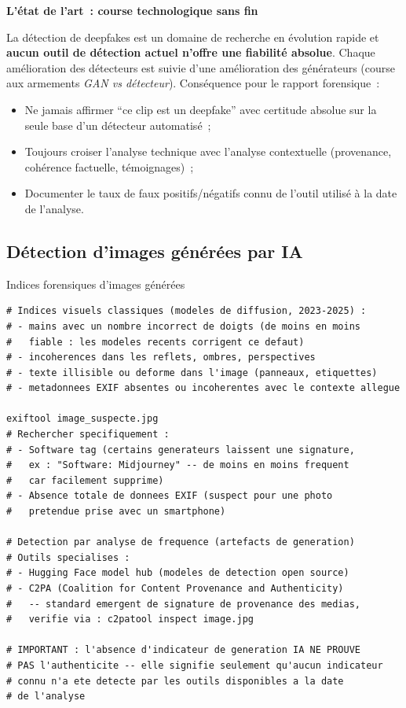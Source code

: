 \begin{boxalert}
\textbf{L'état de l'art~: course technologique sans fin}

La détection de deepfakes est un domaine de recherche en évolution
rapide et \textbf{aucun outil de détection actuel n'offre une
fiabilité absolue}. Chaque amélioration des détecteurs est suivie
d'une amélioration des générateurs (course aux armements
\textit{GAN vs détecteur}). Conséquence pour le rapport forensique~:
\begin{itemize}
    \item Ne jamais affirmer ``ce clip est un deepfake'' avec
          certitude absolue sur la seule base d'un détecteur
          automatisé~;
    \item Toujours croiser l'analyse technique avec l'analyse
          contextuelle (provenance, cohérence factuelle, témoignages)~;
    \item Documenter le taux de faux positifs/négatifs connu
          de l'outil utilisé à la date de l'analyse.
\end{itemize}
\end{boxalert}

\subsection{Détection d'images générées par IA}

\begin{boxoutils}{Indices forensiques d'images générées}
\begin{lstlisting}[language=bash_forensique]
# Indices visuels classiques (modeles de diffusion, 2023-2025) :
# - mains avec un nombre incorrect de doigts (de moins en moins
#   fiable : les modeles recents corrigent ce defaut)
# - incoherences dans les reflets, ombres, perspectives
# - texte illisible ou deforme dans l'image (panneaux, etiquettes)
# - metadonnees EXIF absentes ou incoherentes avec le contexte allegue

exiftool image_suspecte.jpg
# Rechercher specifiquement :
# - Software tag (certains generateurs laissent une signature,
#   ex : "Software: Midjourney" -- de moins en moins frequent
#   car facilement supprime)
# - Absence totale de donnees EXIF (suspect pour une photo
#   pretendue prise avec un smartphone)

# Detection par analyse de frequence (artefacts de generation)
# Outils specialises : 
# - Hugging Face model hub (modeles de detection open source)
# - C2PA (Coalition for Content Provenance and Authenticity)
#   -- standard emergent de signature de provenance des medias,
#   verifie via : c2patool inspect image.jpg

# IMPORTANT : l'absence d'indicateur de generation IA NE PROUVE
# PAS l'authenticite -- elle signifie seulement qu'aucun indicateur
# connu n'a ete detecte par les outils disponibles a la date
# de l'analyse
\end{lstlisting}
\end{boxoutils}

